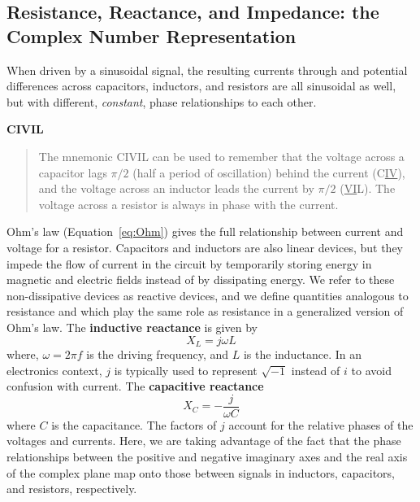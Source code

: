 \documentclass[11pt]{article}
\begin{document}
\subsection{Resistance, Reactance, and Impedance: the Complex Number 
  Representation}

When driven by a sinusoidal signal, the resulting currents through and
potential differences across capacitors, inductors, and resistors are
all sinusoidal as well, but with different, \textit{constant}, phase
relationships to each other.

\begin{latexonly}
  \noindent
  \hrulefill
\end{latexonly}

\htmlrule
\noindent
\textbf{CIVIL}
\begin{quote}
The mnemonic CIVIL can be used to remember that the voltage across a
capacitor lags $\pi/2$ (half a period of oscillation) behind the
current (C\underline{IV}), and the voltage across an inductor leads
the current by $\pi/2$ (\underline{VI}L). The voltage across a
resistor is always in phase with the current.
\end{quote}
\htmlrule

\begin{latexonly}
  \noindent
  \hrulefill
\end{latexonly}

Ohm's law (Equation~\ref{eq:Ohm}) gives the full relationship between
current and voltage for a resistor. Capacitors and inductors are also
linear devices, but they impede the flow of current in the circuit by
temporarily storing energy in magnetic and electric fields instead of
by dissipating energy. We refer to these non-dissipative devices as
reactive devices, and we define quantities analogous to resistance and
which play the same role as resistance in a generalized version of
Ohm's law. The \textbf{inductive reactance} is given by
\begin{equation}
  X_L = j \omega L
  \label{eq:xl}
\end{equation}
where, $\omega = 2 \pi f$ is the driving frequency, and $L$ is the
inductance. In an electronics context, $j$ is typically used to
represent $\sqrt{-1}$ instead of $i$ to avoid confusion with
current. The \textbf{capacitive reactance}
\begin{equation}
  X_C = -\frac{j}{\omega C}
  \label{eq:xc}
\end{equation}
where $C$ is the capacitance. The factors of $j$ account for the
relative phases of the voltages and currents. Here, we are taking
advantage of the fact that the phase relationships between the
positive and negative imaginary axes and the real axis of the complex
plane map onto those between signals in inductors, capacitors, and
resistors, respectively.
\end{document}
